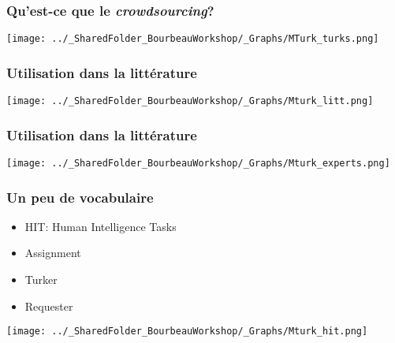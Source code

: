 \documentclass{beamer}
\begin{document}

    \begin{frame}
    
      \frametitle{Qu’est-ce que le \emph{crowdsourcing}?} \vspace{1cm}
      
       \begin{center}
         \texttt{[image: ../\_SharedFolder\_BourbeauWorkshop/\_Graphs/MTurk\_turks.png]}
        \end{center} 
   
         
    \end{frame}  
    

    \begin{frame}
    
      \frametitle{Utilisation dans la littérature} \vspace{1cm}
      
       \begin{center}
         \texttt{[image: ../\_SharedFolder\_BourbeauWorkshop/\_Graphs/Mturk\_litt.png]}
        \end{center} 
   
         
    \end{frame}  
  
  

    \begin{frame}
    
      \frametitle{Utilisation dans la littérature} \vspace{1cm}
      
       \begin{center}
         \texttt{[image: ../\_SharedFolder\_BourbeauWorkshop/\_Graphs/Mturk\_experts.png]}
        \end{center} 
   
         
    \end{frame}  
    
    

    \begin{frame}
    
      \frametitle{Un peu de vocabulaire} \vspace{1cm}
      
       \begin{itemize}
          \item{HIT: Human Intelligence Tasks}
          \item{Assignment}
          \item{Turker}
          \item{Requester}
        \end{itemize}
   
   \begin{flushright}
     	    \texttt{[image: ../\_SharedFolder\_BourbeauWorkshop/\_Graphs/Mturk\_hit.png]}
    \end{flushright} 
         
    \end{frame}  
    
\end{document}
